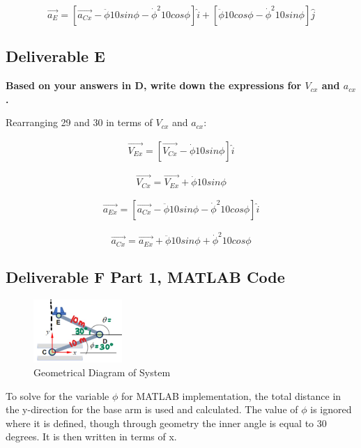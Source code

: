 \documentclass[12pt, a4paper]{article}
\begin{document}
\begin{equation}
    \vec{a_E} = [\vec{a_{Cx}}-\ddot\phi 10sin\phi - \dot\phi^2 10cos\phi]\hat{i} + [\ddot\phi 10cos\phi - \dot\phi^2 10sin\phi]\hat{j}
\end{equation}

\newpage
\subsection{Deliverable E}

\textbf{Based on your answers in D, write down the expressions for $V_{cx}$ and $a_{cx}$.}

Rearranging 29 and 30 in terms of $V_{cx}$ and $a_{cx}$: 

\begin{align*}
    \vec{V_{Ex}} = [\vec{V_{Cx}}-\dot\phi10sin\phi]\hat{i} 
\end{align*}

\begin{equation}
    \vec{V_{Cx}} = \vec{V_{Ex}} + \dot\phi10sin\phi
\end{equation}

\begin{align*}
    \vec{a_{Ex}} = [\vec{a_{Cx}}-\ddot\phi 10sin\phi - \dot\phi^2 10cos\phi]\hat{i} 
\end{align*}

\begin{equation}
    \vec{a_{Cx}} = \vec{a_{Ex}} + \ddot\phi 10sin\phi + \dot\phi^2 10cos\phi
\end{equation}

\newpage
\subsection{Deliverable F Part 1, MATLAB Code}

\begin{figure}[htbp]
    \centering
    \includegraphics[width=0.3\textwidth]{figure3.jpg}
    \caption{Geometrical Diagram of System}
    \label{fig:label2}
\end{figure}

\FloatBarrier

To solve for the variable $\phi$ for MATLAB implementation, the total distance in the y-direction for the base arm is used and calculated. The value of $\phi$ is ignored where it is defined, though through geometry the inner angle is equal to 30 degrees. It is then written in terms of x. 
\end{document}
